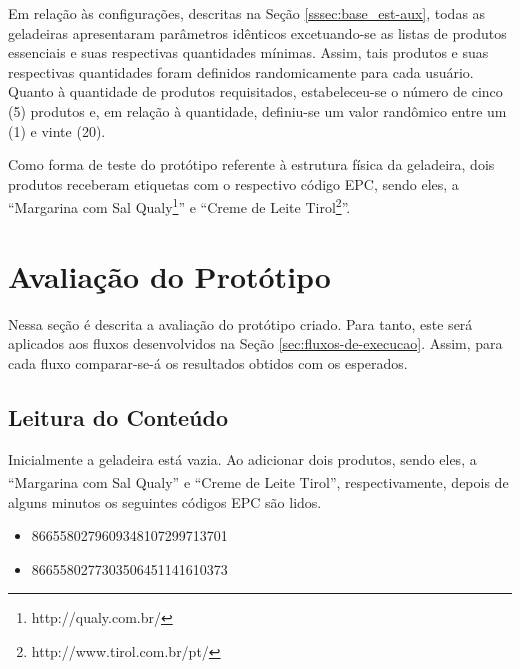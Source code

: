 Em relação às configurações, descritas na Seção \ref{sssec:base_est-aux}, todas as geladeiras apresentaram parâmetros idênticos excetuando-se as listas de produtos essenciais e suas respectivas quantidades mínimas. Assim, tais produtos e suas respectivas quantidades foram definidos randomicamente para cada usuário.
Quanto à quantidade de produtos requisitados, estabeleceu-se o número de cinco (5) produtos e, em relação à quantidade, definiu-se um valor randômico entre um (1) e vinte (20).

Como forma de teste do protótipo referente à estrutura física da geladeira, dois produtos receberam etiquetas com o respectivo código EPC, sendo eles, a ``Margarina com Sal Qualy\textsuperscript{\textregistered}\footnote{http://qualy.com.br/}'' e ``Creme de Leite Tirol\textsuperscript{\textregistered}\footnote{http://www.tirol.com.br/pt/}''.

\section{Avaliação do Protótipo}

Nessa seção é descrita a avaliação do protótipo criado. Para tanto, este será aplicados aos fluxos desenvolvidos na Seção \ref{sec:fluxos-de-execucao}. Assim, para cada fluxo comparar-se-á os resultados obtidos com os esperados.


\subsection{Leitura do Conteúdo}
 Inicialmente a geladeira está vazia.
 Ao adicionar dois produtos, sendo eles, a ``Margarina com Sal Qualy\textsuperscript{\textregistered}'' e ``Creme de Leite Tirol\textsuperscript{\textregistered}'', respectivamente, depois de alguns minutos os seguintes códigos EPC são lidos.
 
\begin{itemize}[noitemsep,topsep=5pt]
     \item 8665580279609348107299713701
     \item 8665580277303506451141610373
 \end{itemize}
 
